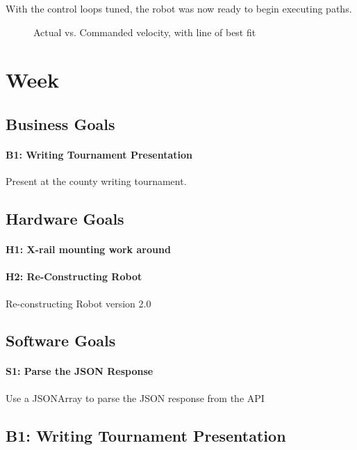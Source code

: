\documentclass{article}
\begin{document}
With the control loops tuned, the robot was now ready to begin executing paths.

\begin {figure}
\centering
{}
\caption {Actual vs. Commanded velocity, with line of best fit}
\label {fig:graph}
\end{figure}
\clearpage \newpage \section{Week \thesection} 
\subsection{Business Goals}
\paragraph{B1: Writing Tournament Presentation}
 Present at the county writing tournament.
\subsection{Hardware Goals}
\paragraph{H1: X-rail mounting work around}

\paragraph{H2: Re-Constructing Robot}
 Re-constructing Robot version 2.0
\subsection{Software Goals}
\paragraph{S1: Parse the JSON Response}
 Use a JSONArray to parse the JSON response from the API
\newpage
\subsection{B1: Writing Tournament Presentation}
\end{document}
